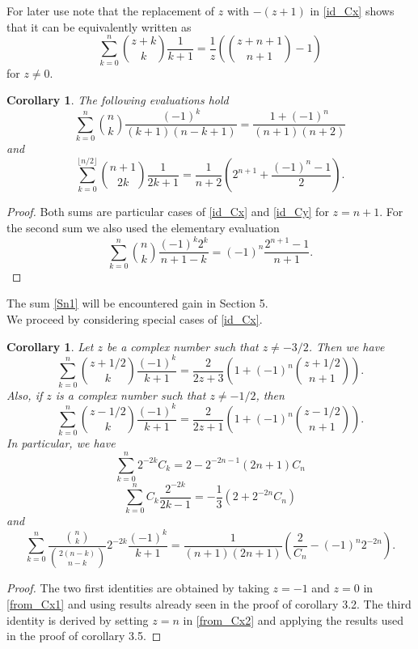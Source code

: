 \documentclass[11pt,reqno]{amsart}
\theoremstyle{plain}
\numberwithin{equation}{section}
\newtheorem{corollary}[thm]{Corollary}
\begin{document}
For later use note that the replacement of $z$ with $-(z+1)$ in \eqref{id_Cx} shows that it can be equivalently written as 
\begin{equation}\label{eq_8}
\sum_{k=0}^n \binom{z+k}{k} \frac{1}{k+1} = \frac{1}{z} \left(\binom{z+n+1}{n+1} - 1 \right)
\end{equation}
for $z\neq 0$.

\begin{corollary}
The following evaluations hold
\begin{equation}\label{Sn1}
\sum_{k=0}^n \binom{n}{k} \frac{(-1)^k}{(k+1)(n-k+1)} = \frac{1+(-1)^n}{(n+1)(n+2)}
\end{equation}
and
\begin{equation}
\sum_{k=0}^{\lfloor{n/2}\rfloor} \binom{n+1}{2k} \frac{1}{2k+1} = \frac{1}{n+2}\left (2^{n+1} + \frac{(-1)^n-1}{2}\right ).
\end{equation}
\end{corollary} 
\begin{proof}
Both sums are particular cases of \eqref{id_Cx} and \eqref{id_Cy} for $z=n+1$. For the second sum we also used the elementary evaluation
$$\sum_{k=0}^n \binom{n}{k} \frac{(-1)^k 2^k}{n+1-k} = (-1)^n \frac{2^{n+1}-1}{n+1}.$$
\end{proof}

The sum \eqref{Sn1} will be encountered gain in Section 5.\\

We proceed by considering special cases of \eqref{id_Cx}.

\begin{corollary}
Let $z$ be a complex number such that $z\neq -3/2$. Then we have
\begin{equation}\label{from_Cx1}
\sum_{k=0}^n \binom{z+1/2}{k}\frac{(-1)^k}{k+1} = \frac{2}{2z+3}\left ( 1 + (-1)^n \binom{z+1/2}{n+1} \right ).
\end{equation}
Also, if $z$ is a complex number such that $z\neq -1/2$, then
\begin{equation}\label{from_Cx2}
\sum_{k=0}^n \binom{z-1/2}{k}\frac{(-1)^k}{k+1}= \frac{2}{2z+1}\left ( 1 + (-1)^n \binom{z-1/2}{n+1} \right ).
\end{equation}
In particular, we have
\begin{equation}
\sum_{k=0}^n 2^{-2k}C_k=2-2^{-2n-1}(2n+1)C_n
\end{equation}
\begin{equation}
\sum_{k=0}^n C_k \frac{2^{-2k}}{2k-1} = - \frac{1}{3}\left ( 2 + 2^{-2n} C_n \right )
\end{equation}
and
\begin{equation}
\sum_{k=0}^n \frac{\binom{n}{k}}{\binom{2(n-k)}{n-k}} 2^{-2k} \frac{(-1)^k}{k+1} = \frac{1}{(n+1)(2n+1)}\left ( \frac{2}{C_n} - (-1)^n 2^{-2n}\right ).
\end{equation}
\end{corollary}
\begin{proof}
The two first identities are obtained by taking $z=-1$ and $z=0$ in \eqref{from_Cx1} and using results already seen in the proof of corollary 3.2. The third identity is derived by setting $z=n$ in \eqref{from_Cx2} and applying the results used in the proof of corollary 3.5.
\end{proof}
\end{document}
